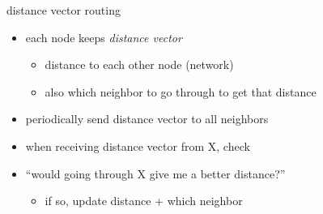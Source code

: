 \begin{frame}{distance vector routing}
    \begin{itemize}
    \item each node keeps \textit{distance vector}
        \begin{itemize}
        \item distance to each other node (network)
        \item also which neighbor to go through to get that distance
        \end{itemize}
    \item periodically send distance vector to all neighbors
    \item when receiving distance vector from X, check
    \item ``would going through X give me a better distance?''
        \begin{itemize}
        \item if so, update distance + which neighbor
        \end{itemize}
    \end{itemize}
\end{frame}
